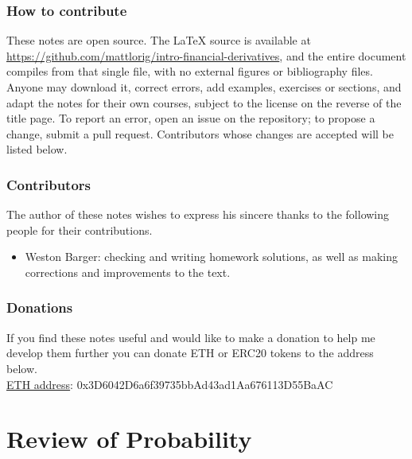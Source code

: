 \documentclass[12pt]{book}
\numberwithin{equation}{chapter}
\theoremstyle{plain}
\numberwithin{theorem}{section}
\theoremstyle{definition}
\numberwithin{exercise}{chapter}
\newcommand{\<}{\langle}
\renewcommand{\>}{\rangle}
\renewcommand{\(}{\left(}
\renewcommand{\)}{\right)}
\renewcommand{\[}{\left[}
\renewcommand{\]}{\right]}
\theoremstyle{definition}
\numberwithin{question}{section}
\begin{document}
\subsection*{How to contribute}
These notes are open source.  The LaTeX source is available at \url{https://github.com/mattlorig/intro-financial-derivatives}, and the entire document compiles from that single file, with no external figures or bibliography files.  Anyone may download it, correct errors, add examples, exercises or sections, and adapt the notes for their own courses, subject to the license on the reverse of the title page.  To report an error, open an issue on the repository; to propose a change, submit a pull request.  Contributors whose changes are accepted will be listed below.

\subsection*{Contributors}
The author of these notes wishes to express his sincere thanks to the following people for their contributions.
\begin{itemize}
\item Weston Barger: checking and writing homework solutions, as well as making corrections and improvements to the text.
\end{itemize}

\subsection*{Donations}
If you find these notes useful and would like to make a donation to help me develop them further you can donate ETH or ERC20 tokens to the address below.\\[0.25em]
\underline{ETH address}: 0x3D6042D6a6f39735bbAd43ad1Aa676113D55BaAC


\mainmatter





\chapter{Review of Probability}
\end{document}
